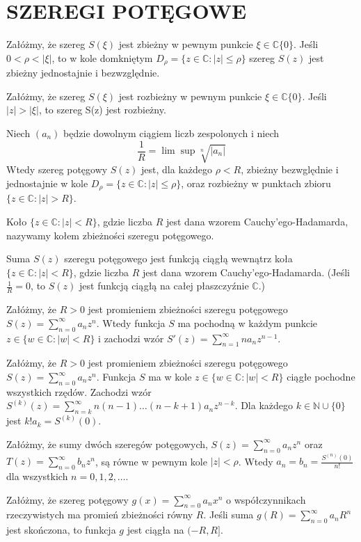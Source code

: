 \documentclass[12pt]{article}
\newcommand{\N}{\mathbb{N}}
\newcommand{\C}{\mathbb{C}}
\begin{document}
\section*{SZEREGI POTĘGOWE}

\theorem{}
Załóżmy, że szereg $S(\xi)$ jest zbieżny w pewnym punkcie $\xi \in \C  \{0\}$.
Jeśli $0 < \rho < |\xi|$, to w kole domkniętym $D_{\rho} = \{z \in \C: |z| \leq \rho\}$ szereg $S(z)$ jest zbieżny jednostajnie i bezwzględnie.

\theorem{}
Załóżmy, że szereg $S(\xi)$ jest rozbieżny w pewnym punkcie $\xi \in \C \{0\}$.
Jeśli $|z| > |\xi|$, to szereg S(z) jest rozbieżny.

Niech $(a_n)$ będzie dowolnym ciągiem liczb zespolonych i niech
$$\frac{1}{R} = \lim \sup \sqrt[n]{|a_n|}$$
Wtedy szereg potęgowy $S(z)$ jest, dla każdego $\rho < R$, zbieżny bezwględnie i jednostajnie w
kole $D_{\rho} = \{z \in \C: |z| \leq \rho\}$, oraz rozbieżny w punktach zbioru $\{z \in \C: |z| > R\}$.

Koło $\{z \in \C: |z| < R\}$, gdzie liczba $R$ jest dana wzorem Cauchy’ego-Hadamarda, nazywamy kołem zbieżności szeregu potęgowego.

\theorem{}
Suma $S(z)$ szeregu potęgowego jest funkcją ciągłą wewnątrz koła $\{z \in \C: |z| < R\}$, gdzie liczba $R$ jest dana wzorem Cauchy’ego-Hadamarda. (Jeśli $\frac{1}{R} = 0$, to $S(z)$ jest funkcją
ciągłą na całej płaszczyźnie $\C$.)

\theorem{}
Załóżmy, że $R > 0$ jest promieniem zbieżności szeregu potęgowego
$S(z) = \sum_{n=0}^\infty a_nz^n$.
Wtedy funkcja $S$ ma pochodną w każdym punkcie $z \in \{w \in \C: |w| < R\}$ i zachodzi wzór
$S'(z) = \sum_{n=1}^\infty n a_n z^{n-1}$.

\theorem{}
Załóżmy, że $R > 0$ jest promieniem zbieżności szeregu potęgowego
$S(z) = \sum_{n=0}^\infty a_nz^n$.
Funkcja $S$ ma w kole $z \in \{w \in \C: |w| < R\}$ ciągłe pochodne wszystkich rzędów. Zachodzi wzór
$S^{(k)} (z) = \sum_{n=k}^\infty n (n - 1) \ldots (n - k + 1) a_n z^{n-k}$.
Dla każdego $k \in \N \cup \{0\}$ jest $k! a_k = S^{(k)}(0)$.

Załóżmy, że sumy dwóch szeregów potęgowych,
$S(z) = \sum_{n=0}^\infty a_n z^n$
oraz $T(z) = \sum_{n=0}^\infty b_n z^n$,
są równe w pewnym kole $|z| < \rho$. Wtedy $a_n = b_n = \frac{S^{(n)}(0)}{n!}$ dla wszystkich $n = 0, 1, 2, \ldots$.

Załóżmy, że szereg potęgowy
$g(x) = \sum_{n=0}^\infty a_n x^n$
o współczynnikach rzeczywistych ma promień zbieżności równy $R$.
Jeśli suma $g(R) = \sum_{n=0}^\infty a_n R^n$
jest skończona, to funkcja $g$ jest ciągła na $(-R, R]$.
\end{document}
